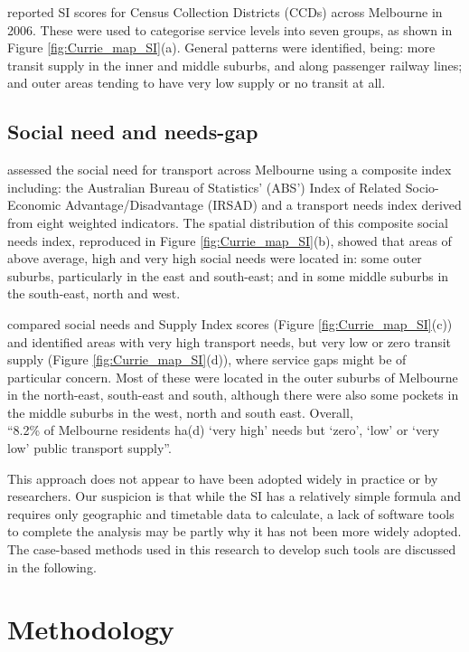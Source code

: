 \documentclass[preprint, 3p,
authoryear]{elsarticle} %
\begin{document}
\citet{currie2010identifying} reported SI scores for Census Collection
Districts (CCDs) across Melbourne in 2006. These were used to categorise
service levels into seven groups, as shown in Figure
\ref{fig:Currie_map_SI}(a). General patterns were identified, being:
more transit supply in the inner and middle suburbs, and along passenger
railway lines; and outer areas tending to have very low supply or no
transit at all.

\subsection{Social need and needs-gap}\label{social-need-and-needs-gap}

\citet{currie2010identifying} assessed the social need for transport
across Melbourne using a composite index including: the Australian
Bureau of Statistics' (ABS') Index of Related Socio-Economic
Advantage/Disadvantage (IRSAD) and a transport needs index derived from
eight weighted indicators. The spatial distribution of this composite
social needs index, reproduced in Figure \ref{fig:Currie_map_SI}(b),
showed that areas of above average, high and very high social needs were
located in: some outer suburbs, particularly in the east and south-east;
and in some middle suburbs in the south-east, north and west.

\citet{currie2010identifying} compared social needs and Supply Index
scores (Figure \ref{fig:Currie_map_SI}(c)) and identified areas with
very high transport needs, but very low or zero transit supply (Figure
\ref{fig:Currie_map_SI}(d)), where service gaps might be of particular
concern. Most of these were located in the outer suburbs of Melbourne in
the north-east, south-east and south, although there were also some
pockets in the middle suburbs in the west, north and south east.
Overall,\\
``8.2\% of Melbourne residents ha(d) `very high' needs but `zero', `low'
or `very low' public transport supply''\citep{currie2010identifying}.

This approach does not appear to have been adopted widely in practice or
by researchers. Our suspicion is that while the SI has a relatively
simple formula and requires only geographic and timetable data to
calculate, a lack of software tools to complete the analysis may be
partly why it has not been more widely adopted. The case-based methods
used in this research to develop such tools are discussed in the
following.

\section{Methodology}\label{methodology}
\end{document}

